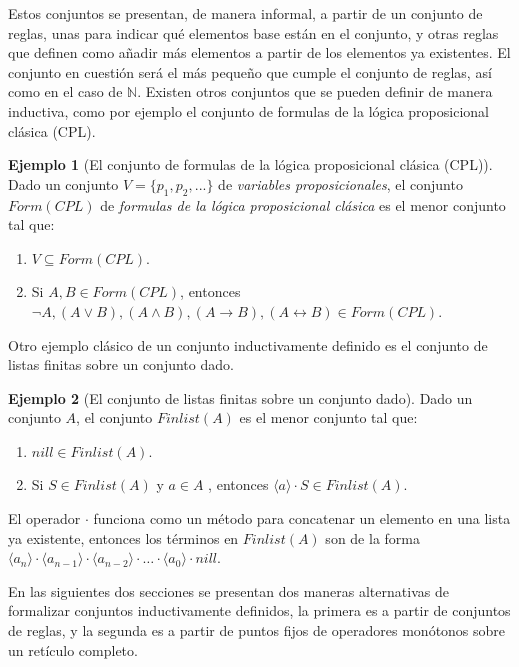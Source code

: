 \documentclass[11pt,oneside]{report}
\theoremstyle{plain}
\theoremstyle{definition}
\newtheorem{ejemplo}{Ejemplo}[chapter]
\newcommand{\N}{\mathbb{N}}
\begin{document}
Estos conjuntos se presentan, de manera informal, a partir de un conjunto de reglas, unas para indicar qué elementos base están en el conjunto, y otras reglas que definen como añadir más elementos a partir de los elementos ya existentes. El conjunto en cuestión será el más pequeño que cumple el conjunto de reglas, así como en el caso de $\N$. Existen otros conjuntos que se pueden definir de manera inductiva, como por ejemplo el conjunto de formulas de la lógica proposicional clásica (CPL).

\begin{ejemplo}[El conjunto de formulas de la lógica proposicional clásica (CPL)]
    Dado un conjunto $V = \{p_1, p_2,...\}$ de \emph{variables proposicionales}, el conjunto $Form(CPL)$ de \emph{formulas de la lógica proposicional clásica} es el menor conjunto tal que:
    \begin{enumerate}
        \item $V \subseteq Form(CPL)$.
        \item Si $A, B \in Form(CPL)$, entonces $\neg A, (A \lor B), (A \land B), (A \rightarrow B), (A \leftrightarrow B) \in Form(CPL)$.
    \end{enumerate}
\end{ejemplo}

Otro ejemplo clásico de un conjunto inductivamente definido es el conjunto de listas finitas sobre un conjunto dado.
\begin{ejemplo}[El conjunto de listas finitas sobre un conjunto dado]
    Dado un conjunto $A$, el conjunto $Finlist(A)$ es el menor conjunto tal que:
    \begin{enumerate}
        \item $nill \in Finlist(A)$.
        \item Si $S \in Finlist(A)$ y $a \in A$ , entonces $\langle a \rangle\cdot S\in Finlist(A)$.
    \end{enumerate}
    El operador $\cdot$ funciona como un método para concatenar un elemento en una lista ya existente, entonces los términos en $Finlist(A)$ son de la forma $\langle a_n\rangle \cdot\langle a_{n-1} \rangle\cdot\langle a_{n-2}\rangle\cdot\ldots\cdot\langle a_{0}\rangle\cdot nill$.
\end{ejemplo}

En las siguientes dos secciones se presentan dos maneras alternativas de formalizar conjuntos inductivamente definidos, la primera es a partir de conjuntos de reglas, y la segunda es a partir de puntos fijos de operadores monótonos sobre un retículo completo.
\end{document}
